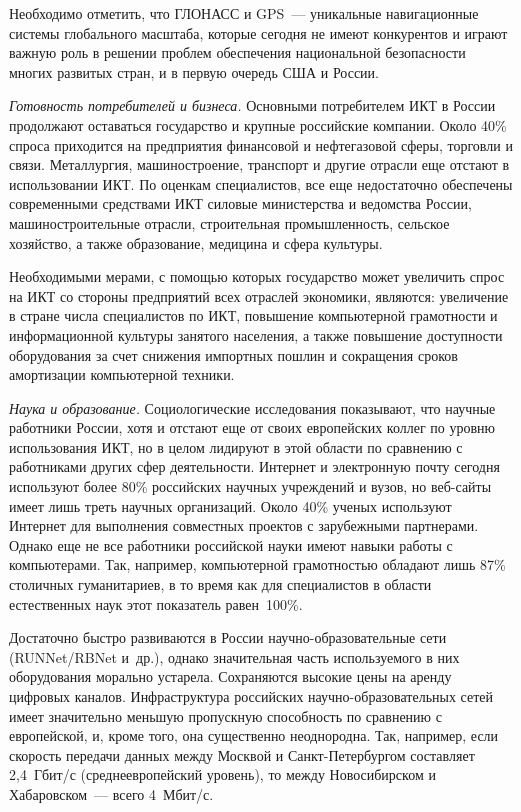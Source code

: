 \begin{multicols}{2}
     Необходимо отметить, что ГЛОНАСС и GPS~--- уникальные
навигационные системы глобального масштаба, которые сегодня не имеют
конкурентов и играют важную роль в решении проблем обеспечения национальной
безопасности многих развитых стран, и в первую очередь США и России.

     \vspace*{1pt}
     \textit{Готовность потребителей и бизнеса.} Основными потребителем ИКТ в
России продолжают оставаться государство и крупные российские компании. Около 40\%
спроса приходится на предприятия финансовой и нефтегазовой сферы, торговли и связи.
Металлургия, машиностроение, транспорт и другие отрасли еще отстают в использовании
ИКТ. По оценкам специалистов, все еще недостаточно обеспечены современными
средствами ИКТ силовые министерства и ведомства России, машиностроительные
отрасли, строительная промышленность, сельское хозяйство, а также образование,
медицина и сфера культуры.

     Необходимыми мерами, с помощью которых государство может увеличить спрос на
ИКТ со стороны предприятий всех отраслей экономики, являются: увеличение в стране
числа специалистов по ИКТ, повышение компьютерной грамотности и информационной
культуры занятого населения, а также повышение доступности оборудования за счет
снижения импортных пошлин и сокращения сроков амортизации компьютерной техники.

     \vspace*{1pt}
     \textit{Наука и образование.} Социологические исследования показывают, что
научные работники России, хотя и отстают еще от своих европейских коллег по уровню
использования ИКТ, но в целом лидируют в этой области по сравнению с работниками
других сфер деятельности. Интернет и электронную почту сегодня используют более 80\%
российских научных учреждений и вузов, но веб-сайты имеет лишь треть научных
организаций. Около 40\% ученых используют Интернет для выполнения совместных
проектов с зарубежными партнерами. Однако еще не все работники российской науки
имеют навыки работы с компьютерами. Так, например, компьютерной грамотностью
обладают лишь 87\% столичных гуманитариев, в то время как для специалистов в области
естественных наук этот показатель равен~100\%.

     Достаточно быстро развиваются в России научно-образовательные сети
(RUNNet/RBNet и~др.), однако значительная часть используемого в них оборудования
морально устарела. Сохраняются высокие цены на аренду цифровых каналов.
Инфраструктура российских научно-образовательных сетей имеет значительно меньшую
пропускную способность по сравнению с европейской, и, кроме того, она существенно
неоднородна. Так, например, если скорость передачи данных между Москвой и 
Санкт-Петербургом составляет 2,4~Гбит/с (среднеевропейский уровень), то между
Новосибирском и Хабаровском~--- всего 4~Мбит/с.


\end{multicols}
